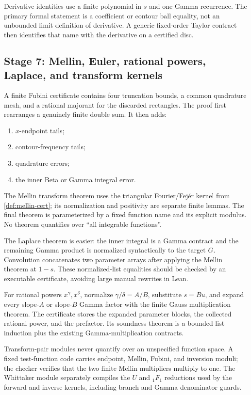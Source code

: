 Derivative identities use a finite polynomial in $s$ and one Gamma recurrence.
The primary formal statement is a coefficient or contour ball equality, not an
unbounded limit definition of derivative.  A generic fixed-order Taylor
contract then identifies that name with the derivative on a certified disc.

\subsection{Stage 7: Mellin, Euler, rational powers, Laplace, and transform kernels}

A finite Fubini certificate contains four truncation bounds, a common
quadrature mesh, and a rational majorant for the discarded rectangles.  The
proof first rearranges a genuinely finite double sum.  It then adds:
\begin{enumerate}
\item $x$-endpoint tails;
\item contour-frequency tails;
\item quadrature errors;
\item the inner Beta or Gamma integral error.
\end{enumerate}
The Mellin transform theorem uses the triangular Fourier/Fej\'er kernel from
\cref{def:mellin-cert}; its normalization and positivity are separate finite
lemmas.  The final theorem is parameterized by a fixed function name and its
explicit modulus.  No theorem quantifies over ``all integrable functions''.

The Laplace theorem is easier: the inner integral is a Gamma contract and the
remaining Gamma product is normalized syntactically to the target $G$.
Convolution concatenates two parameter arrays after applying the Mellin theorem
at $1-s$.  These normalized-list equalities should be checked by an executable
certificate, avoiding large manual rewrites in Lean.

For rational powers $x^\gamma,x^\delta$, normalize
$\gamma/\delta=A/B$, substitute $s=Bu$, and expand every slope-$A$ or
slope-$B$ Gamma factor with the finite Gauss multiplication theorem.  The
certificate stores the expanded parameter blocks, the collected rational
power, and the prefactor.  Its soundness theorem is a bounded-list induction
plus the existing Gamma-multiplication contracts.

Transform-pair modules never quantify over an unspecified function space.  A
fixed test-function code carries endpoint, Mellin, Fubini, and inversion
moduli; the checker verifies that the two finite Mellin multipliers multiply to
one.  The Whittaker module separately compiles the $U$ and ${}_1F_1$
reductions used by the forward and inverse kernels, including branch and Gamma
denominator guards.

